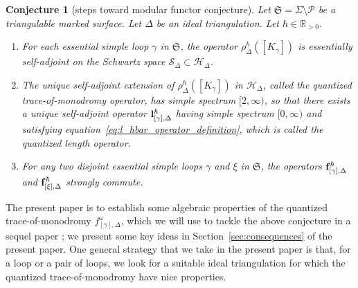 \documentclass[10pt,a4paper]{amsart}
\numberwithin{equation}{section}
\newtheorem{Conjecture}[Theorem]{Conjecture}
\theoremstyle{definition}
\begin{document}
\begin{Conjecture}[steps toward modular functor conjecture]
\label{conjecture:sequel}
Let $\mathfrak{S} = \Sigma \setminus \mathcal{P}$ be a triangulable marked surface. Let $\Delta$ be an ideal triangulation. Let $\hbar \in \mathbb{R}_{>0}$.
\begin{enumerate}[label={\rm (\arabic*)}]\itemsep=0pt
\item For each essential simple loop $\gamma$ in $\mathfrak{S}$, the operator $\rho^\hbar_\Delta([K_\gamma])$ is essentially self-adjoint on the Schwartz space $\mathscr{S}_\Delta \subset \mathscr{H}_\Delta$.
\item The unique self-adjoint extension  of $\rho^\hbar_\Delta([K_\gamma])$ in $\mathscr{H}_\Delta$, called the quantized trace\nobreakdash-of-mo\-no\-dromy operator, has simple spectrum $[2,\infty)$, so that there exists a unique self\nobreakdash-ad\-joint operator ${\bf l}^\hbar_{[\gamma],\Delta}$ having simple spectrum $[0,\infty)$ and satisfying equation~\eqref{eq:l_hbar_operator_definition}, which is called the quantized length operator.
\item For any two disjoint essential simple loops $\gamma$ and $\xi$ in $\mathfrak{S}$, the operators ${\bf f}^\hbar_{[\gamma],\Delta}$ and ${\bf f}^\hbar_{[\xi],\Delta}$ strongly commute.
\end{enumerate}
\end{Conjecture}
The present paper is to establish some algebraic properties of the quantized trace\nobreakdash-of\nobreakdash-mo\-no\-dromy $f^\omega_{[\gamma],\Delta}$, which we will use to tackle the above conjecture in a sequel paper \cite{sequel}; we present some key ideas in Section~\ref{sec:consequences} of the present paper. One general strategy that we take in the present paper is that, for a loop or a pair of loops, we look for a suitable ideal triangulation for which the quantized trace-of-monodromy have nice properties.
\end{document}
